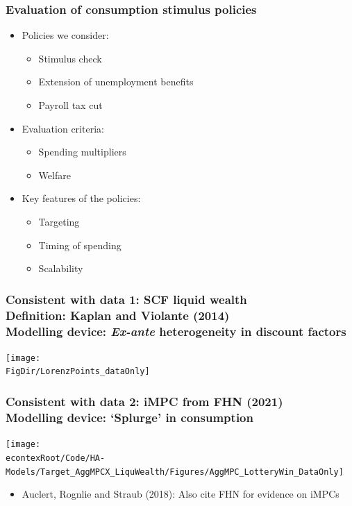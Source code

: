 \documentclass[pdflatex,aspectratio=169]{beamer}
\begin{document}
\begin{frame}
\frametitle{Evaluation of consumption stimulus policies}
\begin{itemize}
	\itemsep = .5\bigskipamount 
	\item Policies we consider: 
		\begin{itemize}
			\itemsep = .25\bigskipamount 
			\item Stimulus check 
			\item Extension of unemployment benefits 
			\item Payroll tax cut 
		\end{itemize}
	\item Evaluation criteria: 
		\begin{itemize}
		\itemsep = .25\bigskipamount 
		\item Spending multipliers 
		\item Welfare 
		\end{itemize}
	\item Key features of the policies: 
		\begin{itemize}
		\itemsep = .25\bigskipamount 
		\item Targeting 
		\item Timing of spending 
		\item Scalability 
		\end{itemize}
\end{itemize}
\end{frame}

\begin{frame}
	\frametitle{Consistent with data 1: SCF liquid wealth \\[1ex]
	\small Definition: Kaplan and Violante (2014) \\[-.5ex] 
	 Modelling device: \textit{Ex-ante} heterogeneity in discount factors \normalsize}
	\centering 
	\texttt{[image: \\FigDir/LorenzPoints\_dataOnly]}
\end{frame}

\begin{frame}
	\frametitle{Consistent with data 2: iMPC from FHN (2021) \\ 
	\small Modelling device: `Splurge' in consumption \normalsize}
	\centering
	\texttt{[image: \\econtexRoot/Code/HA-Models/Target\_AggMPCX\_LiquWealth/Figures/AggMPC\_LotteryWin\_DataOnly]}
	\begin{itemize}
	\itemsep = 0.5\bigskipamount
	\item Auclert, Rognlie and Straub (2018): Also cite FHN for evidence on iMPCs
	\end{itemize}
\end{frame}
\end{document}
